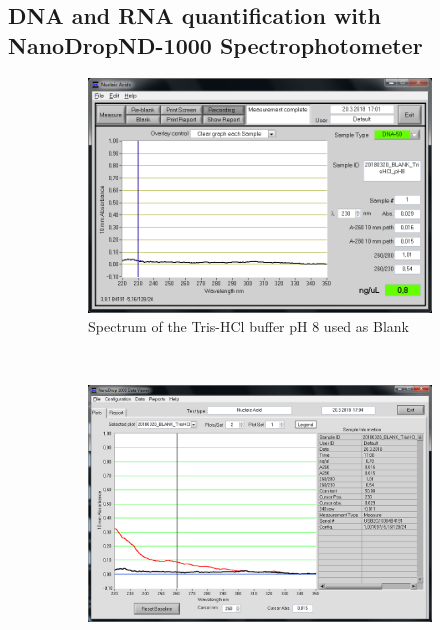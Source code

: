 \subsection{DNA and RNA quantification with NanoDrop\cR ND-1000 Spectrophotometer}
\label{task:20180320_cj3}

\begin{figure}[H] %
    \centering
    \caption{NanoDrop spectra for DNA and RNA isolated with AllPrep\cR Mini Kit}
    \label{fig:label}
    \begin{subfigure}[b]{0.49\textwidth}
        \includegraphics[width=\textwidth]{graphics/screenshots/CJ20180320_BLANK_TrisHCl_pH8.png}
        \caption{Spectrum of the Tris-HCl buffer pH 8 used as Blank}
        \label{sfig:CJ20180320_BLANK_TrisHCl_pH8}
    \end{subfigure}
    ~ 
    \begin{subfigure}[b]{0.49\textwidth}
        \includegraphics[width=\textwidth]{graphics/screenshots/CJ20180320_AllPrep_DNA.png}

\end{subfigure}
\end{figure}
